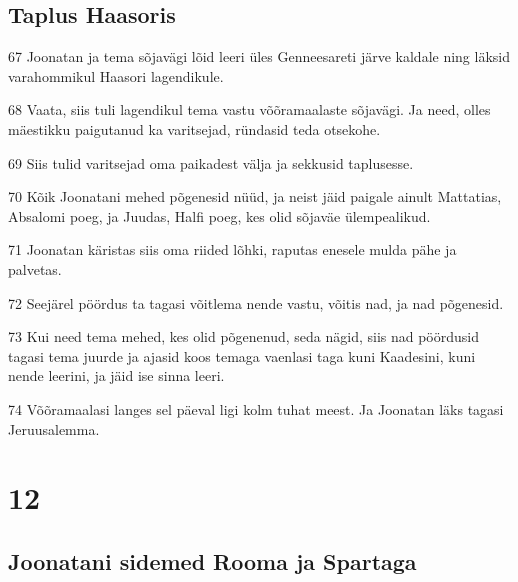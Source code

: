 \section*{Taplus Haasoris}

\par 67 Joonatan ja tema sõjavägi lõid leeri üles Genneesareti järve kaldale ning läksid varahommikul Haasori lagendikule.
\par 68 Vaata, siis tuli lagendikul tema vastu võõramaalaste sõjavägi. Ja need, olles mäestikku paigutanud ka varitsejad, ründasid teda otsekohe.
\par 69 Siis tulid varitsejad oma paikadest välja ja sekkusid taplusesse.
\par 70 Kõik Joonatani mehed põgenesid nüüd, ja neist jäid paigale ainult Mattatias, Absalomi poeg, ja Juudas, Halfi poeg, kes olid sõjaväe ülempealikud.
\par 71 Joonatan käristas siis oma riided lõhki, raputas enesele mulda pähe ja palvetas.
\par 72 Seejärel pöördus ta tagasi võitlema nende vastu, võitis nad, ja nad põgenesid.
\par 73 Kui need tema mehed, kes olid põgenenud, seda nägid, siis nad pöördusid tagasi tema juurde ja ajasid koos temaga vaenlasi taga kuni Kaadesini, kuni nende leerini, ja jäid ise sinna leeri.
\par 74 Võõramaalasi langes sel päeval ligi kolm tuhat meest. Ja Joonatan läks tagasi Jeruusalemma.

\chapter{12}

\section*{Joonatani sidemed Rooma ja Spartaga}

